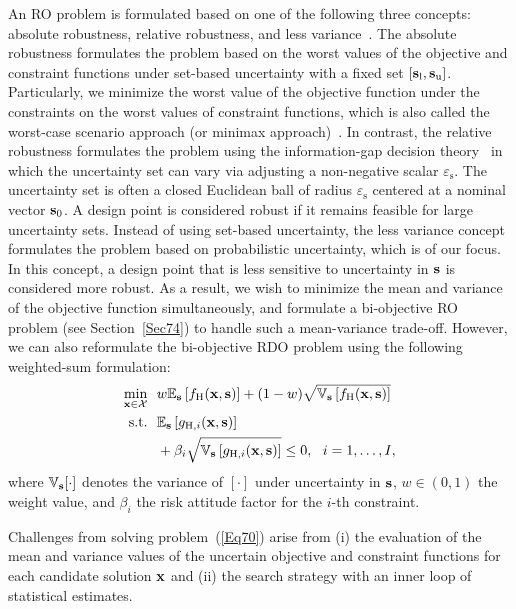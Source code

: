 \documentclass[iicol,sn-basic]{sn-jnl}%
\theoremstyle{thmstyleone}%
\theoremstyle{thmstyletwo}
\theoremstyle{thmstylethree}
\begin{document}
\begin{linenumbers}
An RO problem is formulated based on one of the following three concepts: absolute robustness, relative robustness, and less variance~\citep{Kanno2020}.
The absolute robustness formulates the problem based on the worst values of the objective and constraint functions under set-based uncertainty with a fixed set $[{\bf s}_\text{l},{\bf s}_\text{u}]$.
Particularly, we minimize the worst value of the objective function under the constraints on the worst values of constraint functions, which is also called the worst-case scenario approach (or minimax approach)~\citep{BenTal2009}.
In contrast, the relative robustness formulates the problem using the information-gap decision theory~\citep{Hemez2004} in which the uncertainty set can vary via adjusting a non-negative scalar $\varepsilon_\text{s}$. 
The uncertainty set is often a closed Euclidean ball of radius $\varepsilon_\text{s}$ centered at a nominal vector ${\bf s}_0$.  
A design point is considered robust if it remains feasible for large uncertainty sets.
Instead of using set-based uncertainty, the less variance concept formulates the problem based on probabilistic uncertainty, which is of our focus.
In this concept, a design point that is less sensitive to uncertainty in ${\bf s}$ is considered more robust.
As a result, we wish to minimize the mean and variance of the objective function simultaneously, and formulate a
bi-objective RO problem (see Section~\ref{Sec74}) to handle such a mean-variance trade-off.
However, we can also reformulate the bi-objective RDO problem using the following weighted-sum formulation:
\begin{equation}\label{Eq70}
	\begin{aligned}
		\underset{{\bf x} \in \mathcal{X}}{\min} \ \ & w \mathbb{E}_{\bf s}\left[f_\text{H}({\bf x},{\bf s})\right]+(1-w)\sqrt{\mathbb{V}_{\bf s}\left[f_\text{H}({\bf x},{\bf s})\right]}\\
		\textrm{s.t.} \ \ 
		& \mathbb{E}_{\bf s}\left[g_{\text{H},i}({\bf x},{\bf s})\right] \\
		& + \beta_i \sqrt{\mathbb{V}_{\bf s}\left[g_{\text{H},i}({\bf x},{\bf s})\right]} \leq 0, \ \ i=1,\dots,I, 
	\end{aligned}
\end{equation}
where $\mathbb{V}_{\bf s}[\cdot]$ denotes the variance of $[\cdot]$ under uncertainty in ${\bf s}$, $w \in (0,1)$ the weight value, and $\beta_i$ the risk attitude factor for the $i$-th constraint.

Challenges from solving problem~(\ref{Eq70}) arise from (i) the evaluation of the mean and variance values of the uncertain objective and constraint functions for each candidate solution ${\bf x}$ and (ii) the search strategy with an inner loop of statistical estimates.


\end{linenumbers}
\end{document}
